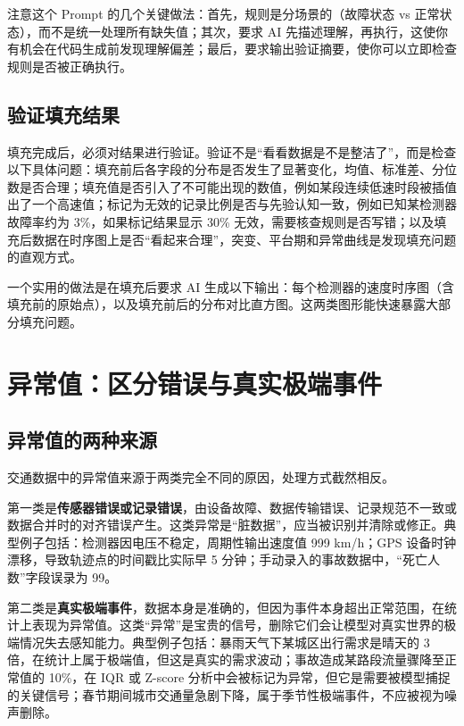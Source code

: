 注意这个 Prompt 的几个关键做法：首先，规则是分场景的（故障状态 vs 正常状态），而不是统一处理所有缺失值；其次，要求 AI 先描述理解，再执行，这使你有机会在代码生成前发现理解偏差；最后，要求输出验证摘要，使你可以立即检查规则是否被正确执行。

\subsection{验证填充结果}

填充完成后，必须对结果进行验证。验证不是“看看数据是不是整洁了”，而是检查以下具体问题：填充前后各字段的分布是否发生了显著变化，均值、标准差、分位数是否合理；填充值是否引入了不可能出现的数值，例如某段连续低速时段被插值出了一个高速值；标记为无效的记录比例是否与先验认知一致，例如已知某检测器故障率约为 3\%，如果标记结果显示 30\% 无效，需要核查规则是否写错；以及填充后数据在时序图上是否“看起来合理”，突变、平台期和异常曲线是发现填充问题的直观方式。

一个实用的做法是在填充后要求 AI 生成以下输出：每个检测器的速度时序图（含填充前的原始点），以及填充前后的分布对比直方图。这两类图形能快速暴露大部分填充问题。

\section{异常值：区分错误与真实极端事件}

\subsection{异常值的两种来源}

交通数据中的异常值来源于两类完全不同的原因，处理方式截然相反。

第一类是\textbf{传感器错误或记录错误}，由设备故障、数据传输错误、记录规范不一致或数据合并时的对齐错误产生。这类异常是“脏数据”，应当被识别并清除或修正。典型例子包括：检测器因电压不稳定，周期性输出速度值 999 km/h；GPS 设备时钟漂移，导致轨迹点的时间戳比实际早 5 分钟；手动录入的事故数据中，“死亡人数”字段误录为 99。

第二类是\textbf{真实极端事件}，数据本身是准确的，但因为事件本身超出正常范围，在统计上表现为异常值。这类“异常”是宝贵的信号，删除它们会让模型对真实世界的极端情况失去感知能力。典型例子包括：暴雨天气下某城区出行需求是晴天的 3 倍，在统计上属于极端值，但这是真实的需求波动；事故造成某路段流量骤降至正常值的 10\%，在 IQR 或 Z-score 分析中会被标记为异常，但它是需要被模型捕捉的关键信号；春节期间城市交通量急剧下降，属于季节性极端事件，不应被视为噪声删除。

